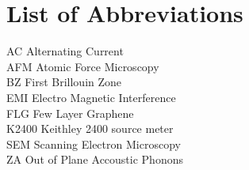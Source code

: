 \chapter*{List of Abbreviations}

\noindent
AC \hfill Alternating Current \\
AFM \hfill Atomic Force Microscopy \\
BZ \hfill First Brillouin Zone \\
EMI \hfill Electro Magnetic Interference \\
FLG \hfill Few Layer Graphene \\
K2400 \hfill Keithley 2400 source meter \\
SEM \hfill Scanning Electron Microscopy \\
ZA \hfill Out of Plane Accoustic Phonons

\newpage